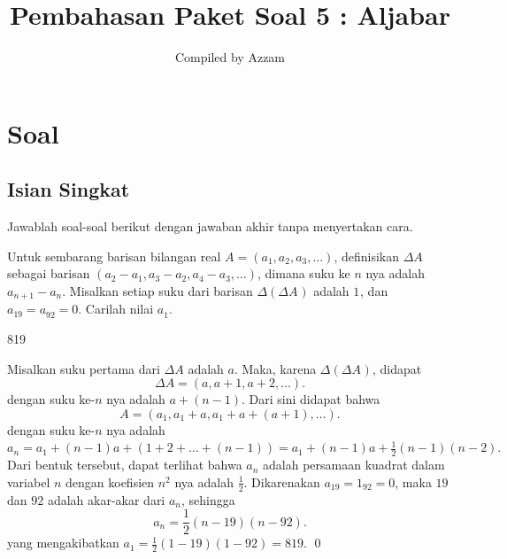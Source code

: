 \documentclass[12pt]{scrartcl}
\begin{document}
	\title{Pembahasan Paket Soal 5 : Aljabar} %
	\date{}
	\author{Compiled by Azzam}
	\maketitle

\renewcommand*\contentsname{Daftar Isi}
\tableofcontents

\newpage
	\newpage
	
	\section{Soal}
\subsection{Isian Singkat}
Jawablah soal-soal berikut dengan jawaban akhir tanpa menyertakan cara.

	\begin{soalbaru}
		Untuk sembarang barisan bilangan real $A=(a_1,a_2,a_3,\ldots)$, definisikan $\Delta A^{}_{}$ sebagai barisan $(a_2-a_1,a_3-a_2,a_4-a_3,\ldots)$, dimana suku ke $n$ nya adalah  $a_{n+1}-a_n^{}$. Misalkan setiap suku dari barisan  $\Delta(\Delta A^{}_{})$ adalah $1^{}_{}$, dan $a_{19}=a_{92}^{}=0$. Carilah nilai $a_1^{}$.
		
		\begin{jawaban}
		819
		\end{jawaban}
		\begin{solusi}
		Misalkan suku pertama dari $\Delta A$ adalah $a$. Maka, karena $\Delta(\Delta A^{}_{})$, didapat $$\Delta A = (a,a+1,a+2,\dots).$$ dengan suku ke-$n$ nya adalah $a+(n-1)$. Dari sini didapat bahwa $$A = (a_1,a_1+a,a_1+a+(a+1),\dots).$$ dengan suku ke-$n$ nya adalah $a_n=a_1+(n-1)a+(1+2+\dots+(n-1))=a_1+(n-1)a+\frac{1}{2}(n-1)(n-2).
		$
		Dari bentuk tersebut, dapat terlihat bahwa $a_n$ adalah persamaan kuadrat dalam variabel $n$ dengan koefisien $n^2$ nya adalah $\frac12$. Dikarenakan $a_{19}=1_{92}=0$, maka $19$ dan $92$ adalah akar-akar dari $a_n$, sehingga $$a_n=\frac12(n-19)(n-92).$$ yang mengakibatkan $a_1=\frac12(1-19)(1-92)=819.$ \qed
		\end{solusi}
	\end{soalbaru}
	
\end{document}
